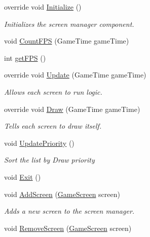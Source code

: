 \begin{DoxyCompactItemize}
\item 
override void \hyperlink{classgearit_1_1xna_1_1_screen_manager_a517b714d143b94e8af31de0f9338eee6}{Initialize} ()
\begin{DoxyCompactList}\small\item\em Initializes the screen manager component. \end{DoxyCompactList}\item 
void \hyperlink{classgearit_1_1xna_1_1_screen_manager_a1c8af9d5ba89dda8aaae47a1698d3ebd}{Count\+F\+P\+S} (Game\+Time game\+Time)
\item 
int \hyperlink{classgearit_1_1xna_1_1_screen_manager_a7aa87268625ff053f43d0b9ff97a4df2}{get\+F\+P\+S} ()
\item 
override void \hyperlink{classgearit_1_1xna_1_1_screen_manager_a99d48169653cd17816c95dc252a51c87}{Update} (Game\+Time game\+Time)
\begin{DoxyCompactList}\small\item\em Allows each screen to run logic. \end{DoxyCompactList}\item 
override void \hyperlink{classgearit_1_1xna_1_1_screen_manager_a8176e4011d5f9278f70390a9e3d7fa1e}{Draw} (Game\+Time game\+Time)
\begin{DoxyCompactList}\small\item\em Tells each screen to draw itself. \end{DoxyCompactList}\item 
void \hyperlink{classgearit_1_1xna_1_1_screen_manager_ab5935512a264bdcce8aadd1c7abc2555}{Update\+Priority} ()
\begin{DoxyCompactList}\small\item\em Sort the list by Draw priority \end{DoxyCompactList}\item 
void \hyperlink{classgearit_1_1xna_1_1_screen_manager_ad61814c406661bd00ded5eb2c84dc201}{Exit} ()
\item 
void \hyperlink{classgearit_1_1xna_1_1_screen_manager_a0f553f48287922f728fe785d50c9c427}{Add\+Screen} (\hyperlink{classgearit_1_1xna_1_1_game_screen}{Game\+Screen} screen)
\begin{DoxyCompactList}\small\item\em Adds a new screen to the screen manager. \end{DoxyCompactList}\item 
void \hyperlink{classgearit_1_1xna_1_1_screen_manager_a0980799f0c3f3667e118674fbfea1e6e}{Remove\+Screen} (\hyperlink{classgearit_1_1xna_1_1_game_screen}{Game\+Screen} screen)

\end{DoxyCompactItemize}
